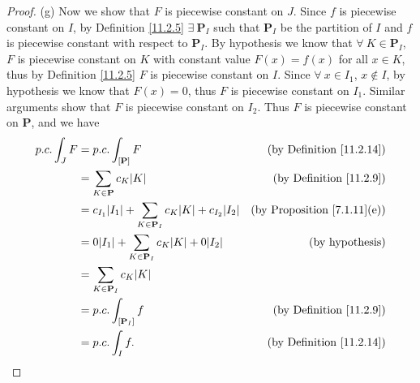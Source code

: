 \begin{proof}{(g)}
    Now we show that \(F\) is piecewise constant on \(J\).
    Since \(f\) is piecewise constant on \(I\), by Definition \ref{11.2.5} \(\exists\ \mathbf{P}_I\) such that \(\mathbf{P}_I\) be the partition of \(I\) and \(f\) is piecewise constant with respect to \(\mathbf{P}_I\).
    By hypothesis we know that \(\forall\ K \in \mathbf{P}_I\), \(F\) is piecewise constant on \(K\) with constant value \(F(x) = f(x)\) for all \(x \in K\), thus by Definition \ref{11.2.5} \(F\) is piecewise constant on \(I\).
    Since \(\forall\ x \in I_1\), \(x \notin I\), by hypothesis we know that \(F(x) = 0\), thus \(F\) is piecewise constant on \(I_1\).
    Similar arguments show that \(F\) is piecewise constant on \(I_2\).
    Thus \(F\) is piecewise constant on \(\mathbf{P}\), and we have
    \begin{align*}
        p.c. \int_J F & = p.c. \int_{[\mathbf{P}]} F                                                       & \text{(by Definition \ref{11.2.14})}    \\
                      & = \sum_{K \in \mathbf{P}} c_K \abs*{K}                                             & \text{(by Definition \ref{11.2.9})}     \\
                      & = c_{I_1} \abs*{I_1} + \sum_{K \in \mathbf{P}_I} c_K \abs*{K} + c_{I_2} \abs*{I_2} & \text{(by Proposition \ref{7.1.11}(e))} \\
                      & = 0 \abs*{I_1} + \sum_{K \in \mathbf{P}_I} c_K \abs*{K} + 0 \abs*{I_2}             & \text{(by hypothesis)}                  \\
                      & = \sum_{K \in \mathbf{P}_I} c_K \abs*{K}                                                                                     \\
                      & = p.c. \int_{[\mathbf{P}_I]} f                                                     & \text{(by Definition \ref{11.2.9})}     \\
                      & = p.c. \int_I f.                                                                   & \text{(by Definition \ref{11.2.14})}
    \end{align*}
\end{proof}

